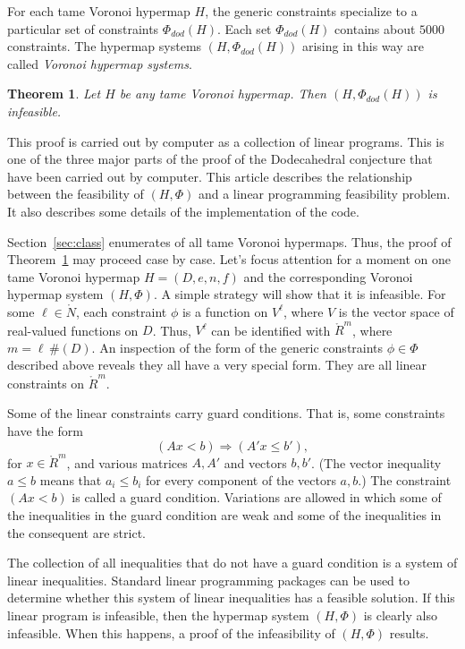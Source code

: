 \documentclass{article} %
\newtheorem{theorem}{Theorem}[section]
\begin{document}
For each tame Voronoi hypermap $H$, the generic constraints specialize
to a particular set of constraints $\Phi_{dod}(H)$. Each set $\Phi_{dod}(H)$
contains about $5000$ constraints. The hypermap
systems $(H, \Phi_{dod}(H))$ arising in this way are called 
\emph{Voronoi hypermap systems}.


\begin{theorem}\label{thm:graph-system}  Let 
$H$ be any tame Voronoi hypermap. 
Then $(H,\Phi_{dod}(H))$ is infeasible.
\end{theorem}

This proof is carried out by computer as a collection of linear
programs. This is one of the three major parts of the proof of the
Dodecahedral conjecture that have been carried out by computer. This
article describes the relationship between the feasibility of
$(H,\Phi)$ and a linear programming feasibility problem. It also
describes some details of the implementation of the code.

Section~\ref{sec:class} enumerates of all tame Voronoi
hypermaps.  Thus, the proof of
Theorem~\ref{thm:graph-system} may proceed case by case.
Let's focus attention for a moment on one tame Voronoi hypermap
$H=(D,e,n,f)$ and the corresponding Voronoi hypermap system
$(H,\Phi)$. A simple strategy will show that it is infeasible. For
some $\ell\in\ring{N}$, each constraint $\phi$ is a function on
$V^\ell$, where $V$ is the vector space of real-valued functions on
$D$. Thus, $V^\ell$ can be identified with $\ring{R}^m$, where $m=
\ell\, \#(D)$. An inspection of the form of the generic constraints
$\phi\in \Phi$ described above reveals they all have a very special
form. They are all linear constraints on $\ring{R}^m$.

Some of the linear constraints
carry guard conditions.  That is, some constraints have the form
  \begin{equation}\label{eqn:guard}
  (A x < b)  \Rightarrow (A' x \le b'),
  \end{equation}
for $x\in\ring{R}^m$, and various matrices $A,A'$ and vectors
$b,b'$.  (The vector inequality $a \le b$ means
that $a_i\le b_i$ for every component of the vectors $a,b$.)
The constraint $(A x < b)$ is called a guard condition.
Variations are allowed in which some of the inequalities in the
guard condition are weak and some of the inequalities in the
consequent are strict.

The collection of all inequalities that do not have a guard 
condition is a system of linear inequalities.  Standard linear
programming packages can be used to determine whether this
system of linear inequalities has a feasible solution.  If this
linear program is infeasible, then the hypermap system $(H,\Phi)$
is clearly also infeasible.  When this happens, a
proof of the infeasibility of $(H,\Phi)$ results.
\end{document}
